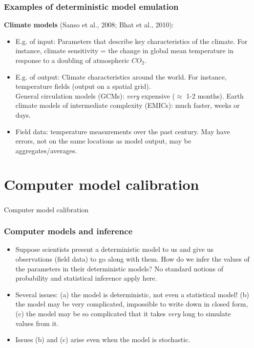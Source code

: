 \documentclass{beamer}
\begin{document}
\begin{frame}
  \frametitle{Examples of deterministic model emulation }
{\bf Climate models} (Sanso et al., 2008; Bhat et al., 2010): 
\begin{itemize}
\item E.g. of input: Parameters that describe key characteristics of the
climate. For instance, climate sensitivity = the change in global mean
temperature in response to a doubling of atmospheric $CO_2$.
\item E.g. of output: Climate characteristics around the world. For instance,
temperature fields (output on a spatial grid). \\
General circulation models (GCMs): {\it very} expensive ($\approx$ 1-2
months). Earth climate models of intermediate complexity (EMICs): much
faster, weeks or days.\\
\item Field data: temperature measurements over the past
century. May have errors, not on the same locations as model output,
may be aggregates/averages.
\end{itemize}
\end{frame}

\section{Computer model calibration}

\begin{frame}
\frametitle{ }
\begin{center}
{\LARGE Computer model calibration}
\end{center}

\end{frame}



\begin{frame}
  \frametitle{Computer models and inference }
\begin{itemize}
\item Suppose scientists present a deterministic model to us and give
  us observations (field data) to go along with them.  How do we infer
  the values of the parameters in their deterministic models?  No
  standard notions of probability and statistical inference apply
  here.
\item Several issues: (a) the model is deterministic, not even a
  statistical model! (b) the model may be very complicated, impossible
  to write down in closed form, (c) the model may be so complicated
  that it takes {\it very} long to simulate values from it. 
\item Issues (b) and (c) arise even when the model is stochastic.
\end{itemize}
\end{frame}
\end{document}
